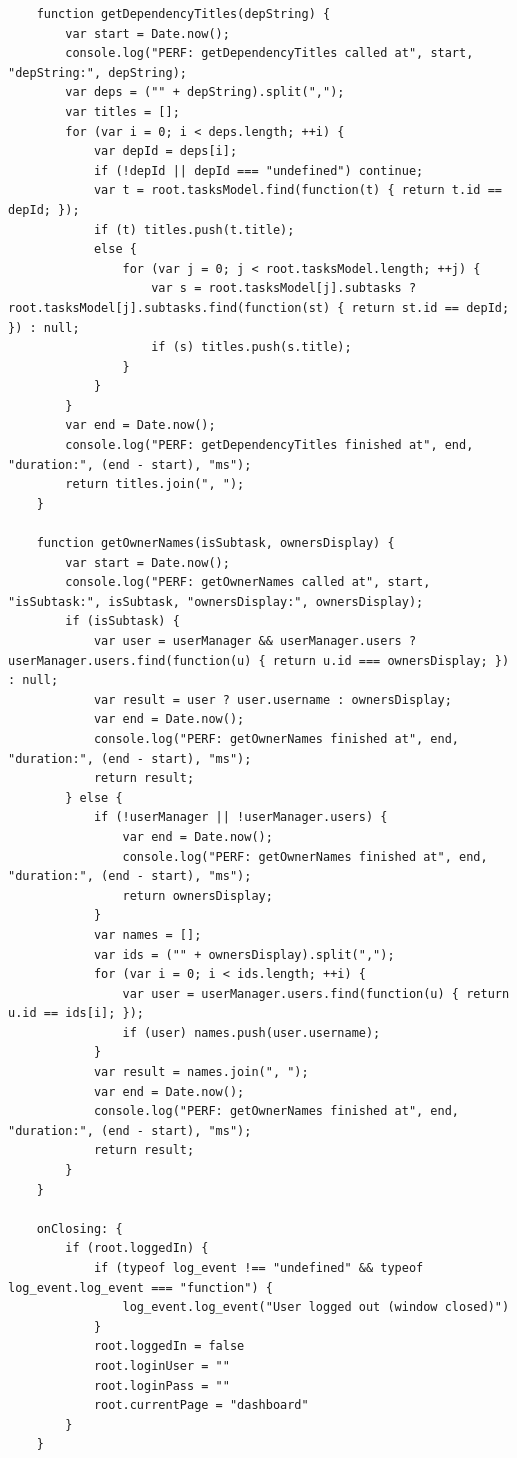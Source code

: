 \documentclass{report}
\begin{document}
\begin{lstlisting}
    function getDependencyTitles(depString) {
        var start = Date.now();
        console.log("PERF: getDependencyTitles called at", start, "depString:", depString);
        var deps = ("" + depString).split(",");
        var titles = [];
        for (var i = 0; i < deps.length; ++i) {
            var depId = deps[i];
            if (!depId || depId === "undefined") continue;
            var t = root.tasksModel.find(function(t) { return t.id == depId; });
            if (t) titles.push(t.title);
            else {
                for (var j = 0; j < root.tasksModel.length; ++j) {
                    var s = root.tasksModel[j].subtasks ? root.tasksModel[j].subtasks.find(function(st) { return st.id == depId; }) : null;
                    if (s) titles.push(s.title);
                }
            }
        }
        var end = Date.now();
        console.log("PERF: getDependencyTitles finished at", end, "duration:", (end - start), "ms");
        return titles.join(", ");
    }

    function getOwnerNames(isSubtask, ownersDisplay) {
        var start = Date.now();
        console.log("PERF: getOwnerNames called at", start, "isSubtask:", isSubtask, "ownersDisplay:", ownersDisplay);
        if (isSubtask) {
            var user = userManager && userManager.users ? userManager.users.find(function(u) { return u.id === ownersDisplay; }) : null;
            var result = user ? user.username : ownersDisplay;
            var end = Date.now();
            console.log("PERF: getOwnerNames finished at", end, "duration:", (end - start), "ms");
            return result;
        } else {
            if (!userManager || !userManager.users) {
                var end = Date.now();
                console.log("PERF: getOwnerNames finished at", end, "duration:", (end - start), "ms");
                return ownersDisplay;
            }
            var names = [];
            var ids = ("" + ownersDisplay).split(",");
            for (var i = 0; i < ids.length; ++i) {
                var user = userManager.users.find(function(u) { return u.id == ids[i]; });
                if (user) names.push(user.username);
            }
            var result = names.join(", ");
            var end = Date.now();
            console.log("PERF: getOwnerNames finished at", end, "duration:", (end - start), "ms");
            return result;
        }
    }

    onClosing: {
        if (root.loggedIn) {
            if (typeof log_event !== "undefined" && typeof log_event.log_event === "function") {
                log_event.log_event("User logged out (window closed)")
            }
            root.loggedIn = false
            root.loginUser = ""
            root.loginPass = ""
            root.currentPage = "dashboard"
        }
    }


\end{lstlisting}
\end{document}
